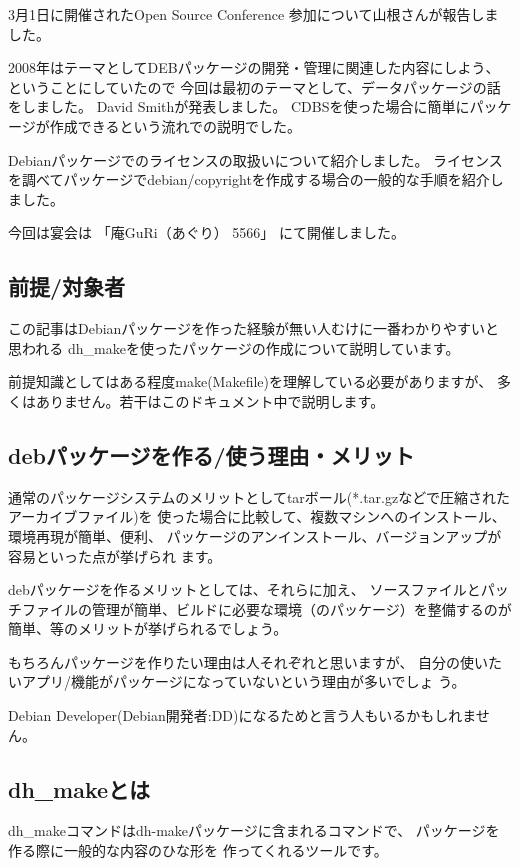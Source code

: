 \documentclass[mingoth,a4paper]{jsarticle}
\begin{document}
3月1日に開催されたOpen Source Conference 参加について山根さんが報告しました。

2008年はテーマとしてDEBパッケージの開発・管理に関連した内容にしよう、ということにしていたので
今回は最初のテーマとして、データパッケージの話をしました。
David Smithが発表しました。
CDBSを使った場合に簡単にパッケージが作成できるという流れでの説明でした。

Debianパッケージでのライセンスの取扱いについて紹介しました。
ライセンスを調べてパッケージでdebian/copyrightを作成する場合の一般的な手順を紹介しました。

今回は宴会は
「庵GuRi（あぐり） 5566」
にて開催しました。


\label{sec:binpkg}

\subsection{前提/対象者}

この記事はDebianパッケージを作った経験が無い人むけに一番わかりやすいと思われる
dh\_makeを使ったパッケージの作成について説明しています。

前提知識としてはある程度make(Makefile)を理解している必要がありますが、
多くはありません。若干はこのドキュメント中で説明します。

\subsection{debパッケージを作る/使う理由・メリット}

通常のパッケージシステムのメリットとしてtarボール(*.tar.gzなどで圧縮されたアーカイブファイル)を
使った場合に比較して、複数マシンへのインストール、環境再現が簡単、便利、
パッケージのアンインストール、バージョンアップが容易といった点が挙げられ
ます。

debパッケージを作るメリットとしては、それらに加え、
ソースファイルとパッチファイルの管理が簡単、ビルドに必要な環境（のパッケージ）を整備するのが
簡単、等のメリットが挙げられるでしょう。

もちろんパッケージを作りたい理由は人それぞれと思いますが、
自分の使いたいアプリ/機能がパッケージになっていないという理由が多いでしょ
う。

Debian Developer(Debian開発者:DD)になるためと言う人もいるかもしれません。


\subsection{dh\_makeとは}
dh\_makeコマンドはdh-makeパッケージに含まれるコマンドで、
パッケージを作る際に一般的な内容のひな形を
作ってくれるツールです。
\end{document}
